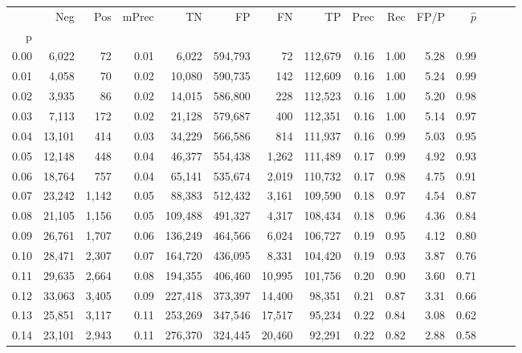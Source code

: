 \begin{tabular}{rrrrrrrrrrrrrrr}
\toprule
{} &     Neg &    Pos & mPrec &       TN &       FP &       FN &       TP &  Prec &   Rec &  FP/P & $\hat{p}$ \\
p    &         &        &       &          &          &          &          &       &       &       &           \\
\midrule
0.00 &   6,022 &     72 &  0.01 &    6,022 &  594,793 &       72 &  112,679 &  0.16 &  1.00 &  5.28 &      0.99 \\
0.01 &   4,058 &     70 &  0.02 &   10,080 &  590,735 &      142 &  112,609 &  0.16 &  1.00 &  5.24 &      0.99 \\
0.02 &   3,935 &     86 &  0.02 &   14,015 &  586,800 &      228 &  112,523 &  0.16 &  1.00 &  5.20 &      0.98 \\
0.03 &   7,113 &    172 &  0.02 &   21,128 &  579,687 &      400 &  112,351 &  0.16 &  1.00 &  5.14 &      0.97 \\
0.04 &  13,101 &    414 &  0.03 &   34,229 &  566,586 &      814 &  111,937 &  0.16 &  0.99 &  5.03 &      0.95 \\
0.05 &  12,148 &    448 &  0.04 &   46,377 &  554,438 &    1,262 &  111,489 &  0.17 &  0.99 &  4.92 &      0.93 \\
0.06 &  18,764 &    757 &  0.04 &   65,141 &  535,674 &    2,019 &  110,732 &  0.17 &  0.98 &  4.75 &      0.91 \\
0.07 &  23,242 &  1,142 &  0.05 &   88,383 &  512,432 &    3,161 &  109,590 &  0.18 &  0.97 &  4.54 &      0.87 \\
0.08 &  21,105 &  1,156 &  0.05 &  109,488 &  491,327 &    4,317 &  108,434 &  0.18 &  0.96 &  4.36 &      0.84 \\
0.09 &  26,761 &  1,707 &  0.06 &  136,249 &  464,566 &    6,024 &  106,727 &  0.19 &  0.95 &  4.12 &      0.80 \\
0.10 &  28,471 &  2,307 &  0.07 &  164,720 &  436,095 &    8,331 &  104,420 &  0.19 &  0.93 &  3.87 &      0.76 \\
0.11 &  29,635 &  2,664 &  0.08 &  194,355 &  406,460 &   10,995 &  101,756 &  0.20 &  0.90 &  3.60 &      0.71 \\
0.12 &  33,063 &  3,405 &  0.09 &  227,418 &  373,397 &   14,400 &   98,351 &  0.21 &  0.87 &  3.31 &      0.66 \\
0.13 &  25,851 &  3,117 &  0.11 &  253,269 &  347,546 &   17,517 &   95,234 &  0.22 &  0.84 &  3.08 &      0.62 \\
0.14 &  23,101 &  2,943 &  0.11 &  276,370 &  324,445 &   20,460 &   92,291 &  0.22 &  0.82 &  2.88 &      0.58 \\

\end{tabular}
